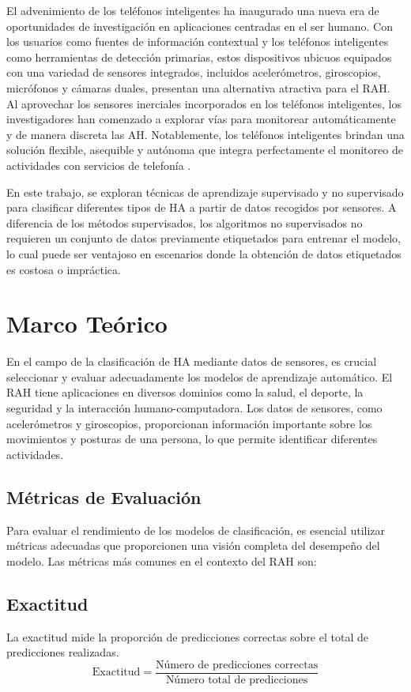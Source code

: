 \documentclass{esannV2}
\begin{document}
El advenimiento de los teléfonos inteligentes ha inaugurado una nueva era de oportunidades de investigación en aplicaciones centradas en el ser humano. Con los usuarios como fuentes de información contextual y los teléfonos inteligentes como herramientas de detección primarias, estos dispositivos ubicuos equipados con una variedad de sensores integrados, incluidos acelerómetros, giroscopios, micrófonos y cámaras duales, presentan una alternativa atractiva para el RAH. Al aprovechar los sensores inerciales incorporados en los teléfonos inteligentes, los investigadores han comenzado a explorar vías para monitorear automáticamente y de manera discreta las AH. Notablemente, los teléfonos inteligentes brindan una solución flexible, asequible y autónoma que integra perfectamente el monitoreo de actividades con servicios de telefonía \cite{esann2013}.

En este trabajo, se exploran técnicas de aprendizaje supervisado y no supervisado para clasificar diferentes tipos de HA a partir de datos recogidos por sensores. A diferencia de los métodos supervisados, los algoritmos no supervisados no requieren un conjunto de datos previamente etiquetados para entrenar el modelo, lo cual puede ser ventajoso en escenarios donde la obtención de datos etiquetados es costosa o impráctica.
\section{Marco Teórico}
En el campo de la clasificación de HA mediante datos de sensores, es crucial seleccionar y evaluar adecuadamente los modelos de aprendizaje automático. El RAH tiene aplicaciones en diversos dominios como la salud, el deporte, la seguridad y la interacción humano-computadora. Los datos de sensores, como acelerómetros y giroscopios, proporcionan información importante sobre los movimientos y posturas de una persona, lo que permite identificar diferentes actividades.

\subsection{Métricas de Evaluación}
Para evaluar el rendimiento de los modelos de clasificación, es esencial utilizar métricas adecuadas que proporcionen una visión completa del desempeño del modelo. Las métricas más comunes en el contexto del RAH son:

\subsection*{Exactitud}
La exactitud mide la proporción de predicciones correctas sobre el total de predicciones realizadas.
\begin{equation}
\text{Exactitud} = \frac{\text{Número de predicciones correctas}}{\text{Número total de predicciones}}
\end{equation}
\end{document}
